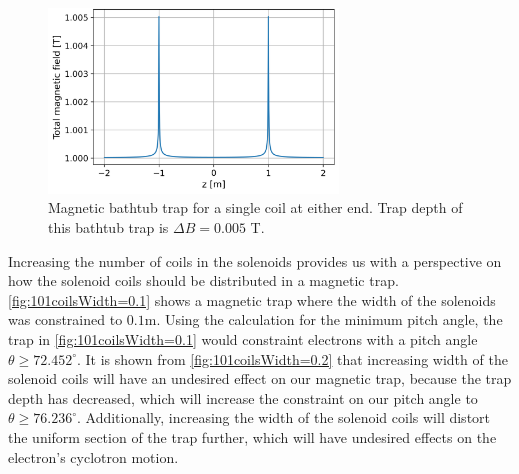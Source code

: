 \documentclass[a4paper,12pt, notitlepage]{article}
\begin{document}
\begin{figure}[t!]
\centering
\includegraphics[width=77mm]{pictures/bathtubTrapCoils1_Width=0,1.png}
\vspace{-2mm}
\caption{Magnetic bathtub trap for a single coil at either end. Trap depth of this bathtub trap is $\Delta B=0.005$ T.}
\label{fig:bathtub1coil}
\end{figure}

Increasing the number of coils in the solenoids provides us with a perspective on how the solenoid coils should be distributed in a magnetic trap. \cref{fig:101coilsWidth=0.1} shows a magnetic trap where the width of the solenoids was constrained to $0.1\textrm{m}$. Using the calculation for the minimum pitch angle, the trap in \cref{fig:101coilsWidth=0.1} would constraint electrons with a pitch angle $\theta \geq 72.452^{\circ}$. It is shown from \cref{fig:101coilsWidth=0.2} that increasing width of the solenoid coils will have an undesired effect on our magnetic trap, because the trap depth has decreased, which will increase the constraint on our pitch angle to $\theta \geq 76.236^{\circ}$. Additionally, increasing the width of the solenoid coils will distort the uniform section of the trap further, which will have undesired effects on the electron's cyclotron motion.
\end{document}
